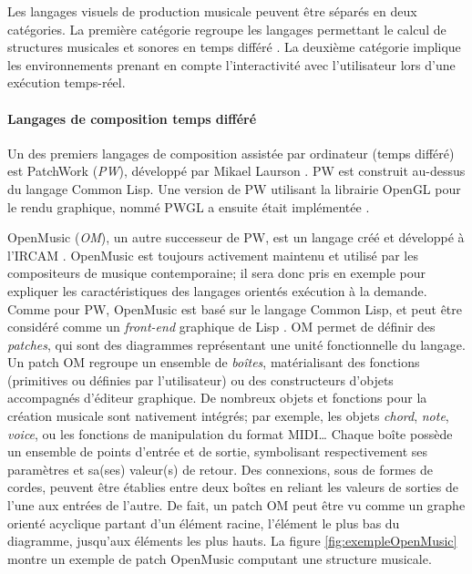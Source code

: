 Les langages visuels de production musicale peuvent être séparés en deux catégories. La première catégorie regroupe les langages permettant le calcul de structures musicales et sonores en \og temps différé \fg. La deuxième catégorie implique les environnements prenant en compte l'interactivité avec l'utilisateur lors d'une exécution temps-réel.

\paragraph{Langages de composition temps différé} Un des premiers langages de composition assistée par ordinateur (temps différé) est PatchWork (\textit{PW}), développé par Mikael Laurson \cite{laurson1989}. PW est construit au-dessus du langage Common Lisp. Une version de PW utilisant la librairie OpenGL pour le rendu graphique, nommé PWGL a ensuite était implémentée \cite{laurson2002}. 

OpenMusic (\textit{OM}), un autre successeur de PW, est un langage créé et développé à l'IRCAM \cite{agon1998, assayag1999}. OpenMusic est toujours activement maintenu et utilisé par les compositeurs de musique contemporaine; il sera donc pris en exemple pour expliquer les caractéristiques des langages orientés exécution à la demande.
Comme pour PW, OpenMusic est basé sur le langage Common Lisp, et peut être considéré comme un \textit{front-end} graphique de Lisp \cite{bresson2009}. OM permet de définir des \textit{patches}, qui sont des diagrammes représentant une unité fonctionnelle du langage. Un patch OM regroupe un ensemble de \textit{boîtes}, matérialisant des fonctions (primitives ou définies par l'utilisateur) ou des constructeurs d'objets accompagnés d'éditeur graphique. De nombreux objets et fonctions pour la création musicale sont nativement intégrés; par exemple, les objets \textit{chord}, \textit{note}, \textit{voice}, ou les fonctions de manipulation du format MIDI… Chaque boîte possède un ensemble de points d'entrée et de sortie, symbolisant respectivement ses paramètres et sa(ses) valeur(s) de retour. Des connexions, sous de formes de cordes, peuvent être établies entre deux boîtes en reliant les valeurs de sorties de l'une aux entrées de l'autre. De fait, un patch OM peut être vu comme un graphe orienté acyclique partant d'un élément racine, l'élément le plus bas du diagramme, jusqu'aux éléments les plus hauts. La figure \ref{fig:exempleOpenMusic} montre un exemple de patch OpenMusic computant une structure musicale.

